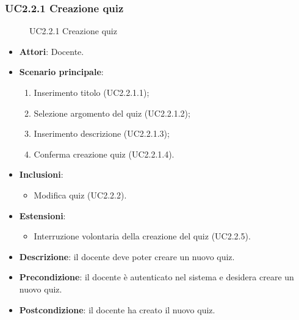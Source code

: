 \subsubsection{UC2.2.1 Creazione quiz}
\begin{figure}[H]
\centering
\noindent{}
\caption{UC2.2.1 Creazione quiz}
\end{figure}
\begin{itemize}
\item \textbf{Attori}: Docente.
\item \textbf{Scenario principale}:
\begin{enumerate}
\item Inserimento titolo (UC2.2.1.1);
\item Selezione argomento del quiz (UC2.2.1.2);
\item Inserimento descrizione (UC2.2.1.3);
\item Conferma creazione quiz (UC2.2.1.4).
\end{enumerate}
\item \textbf{Inclusioni}:
\begin{itemize}
\item Modifica quiz (UC2.2.2).
\end{itemize}
\item \textbf{Estensioni}:
\begin{itemize}
\item Interruzione volontaria della creazione del quiz (UC2.2.5).
\end{itemize}
\item \textbf{Descrizione}: il docente deve poter creare un nuovo quiz.
\item \textbf{Precondizione}: il docente è autenticato nel sistema e desidera creare un nuovo quiz.
\item \textbf{Postcondizione}: il docente ha creato il nuovo quiz.
\end{itemize}
